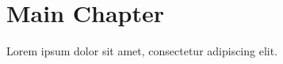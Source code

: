 \chapter{Main Chapter}

Lorem ipsum dolor sit amet, consectetur adipiscing elit. 

\cite{abeniUsingXenKVM2020}
\cite{raoLiveSeamlessFirmware2023}